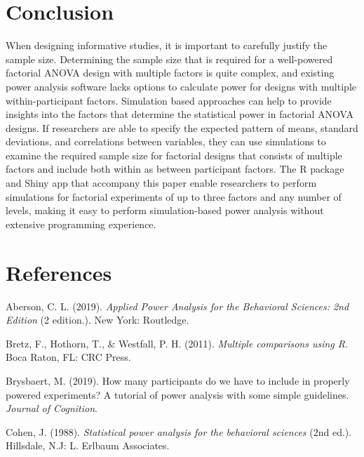 \documentclass[,jou, draftfirst, a4paper,floatsintext]{apa6}
\begin{document}
\hypertarget{conclusion}{%
\section{Conclusion}\label{conclusion}}

When designing informative studies, it is important to carefully justify the sample size.
Determining the sample size that is required for a well-powered factorial ANOVA design with multiple factors is quite complex, and existing power analysis software lacks options to calculate power for designs with multiple within-participant factors.
Simulation based approaches can help to provide insights into the factors that determine the statistical power in factorial ANOVA designs.
If researchers are able to specify the expected pattern of means, standard deviations, and correlations between variables, they can use simulations to examine the required sample size for factorial designs that consists of multiple factors and include both within as between participant factors.
The R package and Shiny app that accompany this paper enable researchers to perform simulations for factorial experiments of up to three factors and any number of levels, making it easy to perform simulation-based power analysis without extensive programming experience.

\newpage

\hypertarget{references}{%
\section{References}\label{references}}

\setlength{\parindent}{-0.5in}
\setlength{\leftskip}{0.5in}

\hypertarget{refs}{}
\leavevmode\hypertarget{ref-aberson_applied_2019}{}%
Aberson, C. L. (2019). \emph{Applied Power Analysis for the Behavioral Sciences: 2nd Edition} (2 edition.). New York: Routledge.

\leavevmode\hypertarget{ref-bretz_multiple_2011}{}%
Bretz, F., Hothorn, T., \& Westfall, P. H. (2011). \emph{Multiple comparisons using R}. Boca Raton, FL: CRC Press.

\leavevmode\hypertarget{ref-brysbaert_how_2019}{}%
Brysbaert, M. (2019). How many participants do we have to include in properly powered experiments? A tutorial of power analysis with some simple guidelines. \emph{Journal of Cognition}.

\leavevmode\hypertarget{ref-cohen_statistical_1988}{}%
Cohen, J. (1988). \emph{Statistical power analysis for the behavioral sciences} (2nd ed.). Hillsdale, N.J: L. Erlbaum Associates.
\end{document}
